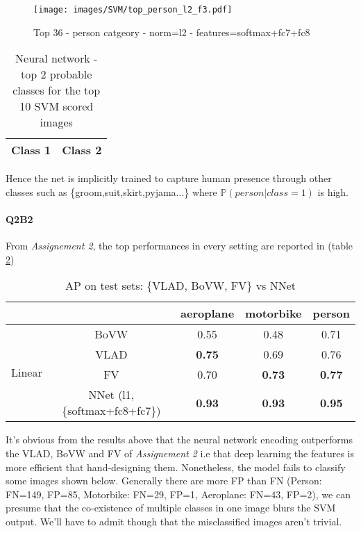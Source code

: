 \documentclass[11pt]{article}
\newcommand{\1}{\mathbbm{1}}
\newcommand{\0}{\mathbf{0}}
\newcommand{\p}{\mathbb{P}}
\begin{document}
		\begin{figure}[H]
			\centering
			\texttt{[image: images/SVM/top\_person\_l2\_f3.pdf]}
			\caption{Top 36 - person catgeory - norm=l2 - features=softmax+fc7+fc8\label{top36}}
		\end{figure}

		\begin{table}[H]
			\centering
			\begin{tabular}{|>{\centering\arraybackslash}p{7cm} >{\centering\arraybackslash}p{7cm}|}
			\hline
			Class 1& Class 2\\
			\hline
			
			\end{tabular}
			\caption{Neural network - top 2 probable classes for the top 10 SVM scored images\label{top10}}
		\end{table}
		Hence the net is implicitly trained to capture human presence through other classes such as \{groom,suit,skirt,pyjama...\} where $\p(person|class=1)$ is high.
	\paragraph{Q2B2}
		From  \textit{Assignement 2}, the top performances in every setting are reported in (table \ref{A2})
		\begin{table}[H]
			\centering
			\caption{AP on test sets: \{VLAD, BoVW, FV\} vs NNet\label{A2}}
			\begin{tabular}{|c|c|c|c|c|}
			\cline{3-5}
			\multicolumn{2}{c|}{} & aeroplane & motorbike & person\\
			\hline
			\multirow{4}{*}{Linear} & BoVW & 0.55 & 0.48 & 0.71\\
			\cline{2-5}
			&VLAD & \textbf{ \color{red}0.75} & 0.69 & 0.76\\
			\cline{2-5}
			&FV & 0.70 & \textbf{ \color{red}0.73} & \textbf{ \color{red}0.77}\\
			\cline{2-5}
			&NNet (l1,\{softmax+fc8+fc7\}) & \textbf{ \color{blue}0.93} & \textbf{ \color{blue}0.93} & \textbf{ \color{blue}0.95}\\
			\hline
			\end{tabular}
		\end{table}
	It's obvious from the results above that the neural network encoding outperforms the VLAD, BoVW and FV of \textit{Assignement 2} i.e that deep learning the features is more efficient that hand-designing them. Nonetheless, the model fails to classify some images shown below. Generally there are more FP than FN (Person: FN=149, FP=85, Motorbike: FN=29, FP=1, Aeroplane: FN=43, FP=2), we can presume that the co-existence of multiple classes in one image blurs the SVM output. We'll have to admit though that the misclassified images aren't trivial.
	
\end{document}
